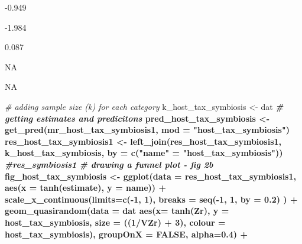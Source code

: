 \documentclass[
]{article}
\newenvironment{Shaded}{\begin{snugshade}}{\end{snugshade}}
\newcommand{\CommentTok}[1]{\textcolor[rgb]{0.56,0.35,0.01}{\textit{#1}}}
\newcommand{\DataTypeTok}[1]{\textcolor[rgb]{0.13,0.29,0.53}{#1}}
\newcommand{\DecValTok}[1]{\textcolor[rgb]{0.00,0.00,0.81}{#1}}
\newcommand{\FloatTok}[1]{\textcolor[rgb]{0.00,0.00,0.81}{#1}}
\newcommand{\KeywordTok}[1]{\textcolor[rgb]{0.13,0.29,0.53}{\textbf{#1}}}
\newcommand{\NormalTok}[1]{#1}
\newcommand{\OperatorTok}[1]{\textcolor[rgb]{0.81,0.36,0.00}{\textbf{#1}}}
\newcommand{\OtherTok}[1]{\textcolor[rgb]{0.56,0.35,0.01}{#1}}
\newcommand{\StringTok}[1]{\textcolor[rgb]{0.31,0.60,0.02}{#1}}
\begin{document}
-0.949

-1.984

0.087

NA

NA

\begin{Shaded}
\begin{Highlighting}[]
\CommentTok{# adding sample size (k) for each category}
\NormalTok{k_host_tax_symbiosis <-}\StringTok{ }\NormalTok{dat }\OperatorTok{%
\CommentTok{# getting estimates and predicitons}
\NormalTok{pred_host_tax_symbiosis <-}\StringTok{ }\KeywordTok{get_pred}\NormalTok{(mr_host_tax_symbiosis1, }\DataTypeTok{mod =} \StringTok{"host_tax_symbiosis"}\NormalTok{) }
\NormalTok{res_host_tax_symbiosis1 <-}\StringTok{ }\KeywordTok{left_join}\NormalTok{(res_host_tax_symbiosis1, k_host_tax_symbiosis, }\DataTypeTok{by =}  \KeywordTok{c}\NormalTok{(}\StringTok{"name"}\NormalTok{ =}\StringTok{ "host_tax_symbiosis"}\NormalTok{))  }\OperatorTok{%
\CommentTok{#res_symbiosis1 }
\CommentTok{# drawing a funnel plot - fig 2b}
\NormalTok{fig_host_tax_symbiosis <-}\StringTok{ }\KeywordTok{ggplot}\NormalTok{(}\DataTypeTok{data =}\NormalTok{ res_host_tax_symbiosis1, }\KeywordTok{aes}\NormalTok{(}\DataTypeTok{x =} \KeywordTok{tanh}\NormalTok{(estimate), }\DataTypeTok{y =}\NormalTok{ name)) }\OperatorTok{+}
\StringTok{  }\KeywordTok{scale_x_continuous}\NormalTok{(}\DataTypeTok{limits=}\KeywordTok{c}\NormalTok{(}\OperatorTok{-}\DecValTok{1}\NormalTok{, }\DecValTok{1}\NormalTok{), }\DataTypeTok{breaks =} \KeywordTok{seq}\NormalTok{(}\OperatorTok{-}\DecValTok{1}\NormalTok{, }\DecValTok{1}\NormalTok{, }\DataTypeTok{by =} \FloatTok{0.2}\NormalTok{) ) }\OperatorTok{+}
\StringTok{  }\KeywordTok{geom_quasirandom}\NormalTok{(}\DataTypeTok{data =}\NormalTok{ dat }\OperatorTok{%
                   \KeywordTok{aes}\NormalTok{(}\DataTypeTok{x=} \KeywordTok{tanh}\NormalTok{(Zr), }\DataTypeTok{y =}\NormalTok{ host_tax_symbiosis, }\DataTypeTok{size =}\NormalTok{ ((}\DecValTok{1}\OperatorTok{/}\NormalTok{VZr) }\OperatorTok{+}\StringTok{ }\DecValTok{3}\NormalTok{), }\DataTypeTok{colour =}\NormalTok{ host_tax_symbiosis), }\DataTypeTok{groupOnX =} \OtherTok{FALSE}\NormalTok{, }\DataTypeTok{alpha=}\FloatTok{0.4}\NormalTok{) }\OperatorTok{+}\StringTok{ }
}}}
\end{Highlighting}
\end{Shaded}
\end{document}
